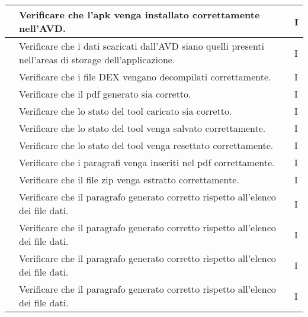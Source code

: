 \begin{center}
\begin{longtable}{ |C{3cm} | C{8.5cm}| C{1.5cm} |}
                     & Verificare che l'apk venga installato correttamente nell'AVD.                                           & I              \\\hline
                     & Verificare che i dati scaricati dall'AVD siano quelli presenti nell'areas di storage dell'applicazione. & I              \\\hline
                     & Verificare che i file DEX vengano decompilati correttamente.                                            & I              \\\hline
                     & Verificare che il pdf generato sia corretto.                                                            & I              \\\hline
                     & Verificare che lo stato del tool caricato sia corretto.                                                 & I              \\\hline
                     & Verificare che lo stato del tool venga salvato correttamente.                                           & I              \\\hline
                     & Verificare che lo stato del tool venga resettato correttamente.                                         & I              \\\hline
                     & Verificare che i paragrafi venga inseriti nel pdf correttamente.                                        & I              \\\hline
                     & Verificare che il file zip venga estratto correttamente.                                                & I              \\\hline
                     & Verificare che il paragrafo generato corretto rispetto all'elenco dei file dati.                        & I              \\\hline
                     & Verificare che il paragrafo generato corretto rispetto all'elenco dei file dati.                        & I              \\\hline
                     & Verificare che il paragrafo generato corretto rispetto all'elenco dei file dati.                        & I              \\\hline
                     & Verificare che il paragrafo generato corretto rispetto all'elenco dei file dati.                        & I              \\\hline

\end{longtable}
\end{center}
